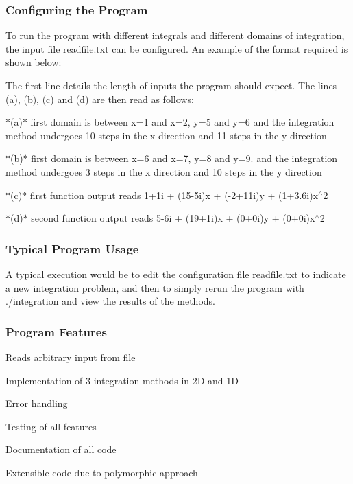 \subsubsection*{Configuring the Program}

To run the program with different integrals and different domains of integration, the input file {\ttfamily readfile.\+txt} can be configured. An example of the format required is shown below\+:



The first line details the length of inputs the program should expect. The lines (a), (b), (c) and (d) are then read as follows\+:
\begin{DoxyItemize}
\item $\ast$(a)$\ast$ first domain is between x=1 and x=2, y=5 and y=6 and the integration method undergoes 10 steps in the x direction and 11 steps in the y direction
\item $\ast$(b)$\ast$ first domain is between x=6 and x=7, y=8 and y=9. and the integration method undergoes 3 steps in the x direction and 10 steps in the y direction
\item $\ast$(c)$\ast$ first function output reads 1+1i + (15-\/5i)x + (-\/2+11i)y + (1+3.6i)x$^\wedge$2
\item $\ast$(d)$\ast$ second function output reads 5-\/6i + (19+1i)x + (0+0i)y + (0+0i)x$^\wedge$2
\end{DoxyItemize}

\subsubsection*{Typical Program Usage}

A typical execution would be to edit the configuration file {\ttfamily readfile.\+txt} to indicate a new integration problem, and then to simply rerun the program with {\ttfamily ./integration} and view the results of the methods.

\subsubsection*{Program Features}


\begin{DoxyItemize}
\item Reads arbitrary input from file
\item Implementation of 3 integration methods in 2D and 1D
\item Error handling
\item Testing of all features
\item Documentation of all code
\item Extensible code due to polymorphic approach
\end{DoxyItemize}

